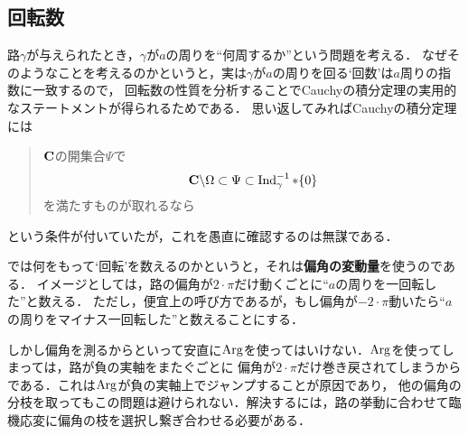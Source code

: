\subsection{回転数}
	
	路$\gamma$が与えられたとき，$\gamma$が$a$の周りを``何周するか''という問題を考える．
	なぜそのようなことを考えるのかというと，実は$\gamma$が$a$の周りを回る`回数'は$a$周りの指数に一致するので，
	回転数の性質を分析することでCauchyの積分定理の実用的なステートメントが得られるためである．
	思い返してみればCauchyの積分定理には
	\begin{quote}
		$\mathbf{C}$の開集合$\Psi$で
		\begin{align}
			\mathbf{C} \backslash \Omega \subset \Psi \subset \operatorname{Ind}_{\gamma}^{-1} \ast \{0\}
		\end{align}
		を満たすものが取れるなら
	\end{quote}
	という条件が付いていたが，これを愚直に確認するのは無謀である．
	
	では何をもって`回転'を数えるのかというと，それは{\bf 偏角の変動量}を使うのである．
	イメージとしては，路の偏角が$2 \cdot \pi$だけ動くごとに``$a$の周りを一回転した''と数える．
	ただし，便宜上の呼び方であるが，もし偏角が$-2\cdot\pi$動いたら``$a$の周りをマイナス一回転した''と数えることにする．
	
	\begin{center}
	\end{center}
	
	しかし偏角を測るからといって安直に$\operatorname{Arg}$を使ってはいけない．$\operatorname{Arg}$を使ってしまっては，路が負の実軸をまたぐごとに
	偏角が$2 \cdot \pi$だけ巻き戻されてしまうからである．これは$\operatorname{Arg}$が負の実軸上でジャンプすることが原因であり，
	他の偏角の分枝を取ってもこの問題は避けられない．解決するには，路の挙動に合わせて臨機応変に偏角の枝を選択し繋ぎ合わせる必要がある．
	
